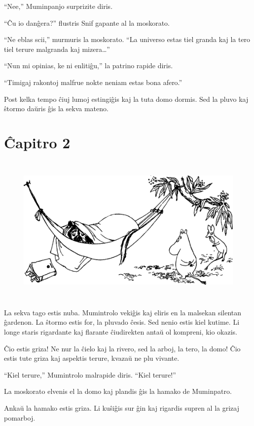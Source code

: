 ``Nee,'' Muminpanjo surprizite diris.

``Ĉu io danĝera?'' flustris Snif gapante al la moskorato.

``Ne eblas scii,'' murmuris la moskorato. ``La universo estas tiel granda kaj la tero tiel terure malgranda kaj mizera{\ldots}''

``Nun mi opinias, ke ni enlitiĝu,'' la patrino rapide diris.

``Timigaj rakontoj malfrue nokte neniam estas bona afero.''

Post kelka tempo ĉiuj lumoj estingiĝis kaj la tuta domo dormis. Sed la pluvo kaj ŝtormo daŭris ĝis la sekva mateno.

\chapter[Ĉapitro 2]{Ĉapitro 2}

\begin{figure}[htbp]
\centering
\includegraphics[width=400pt,height=208pt]{2-1.png}
\caption{}
\label{2-1}
\end{figure}

La sekva tago estis nuba. Mumintrolo vekiĝis kaj eliris en la malsekan silentan ĝardenon. La ŝtormo estis for, la pluvado ĉesis. Sed nenio estis kiel kutime. Li longe staris rigardante kaj flarante ĉiudirekten antaŭ ol kompreni, kio okazis.

Ĉio estis griza! Ne nur la ĉielo kaj la rivero, sed la arboj, la tero, la domo! Ĉio estis tute griza kaj aspektis terure, kvazaŭ ne plu vivante.

``Kiel terure,'' Mumintrolo malrapide diris. ``Kiel terure!''

La moskorato elvenis el la domo kaj plandis ĝis la hamako de Muminpatro.

Ankaŭ la hamako estis griza. Li kuŝiĝis sur ĝin kaj rigardis supren al la grizaj pomarboj.

